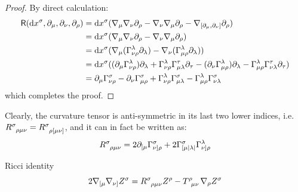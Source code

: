 \begin{proofbox}
  \begin{proof}
    By direct calculation:
    \begin{equation*}
      \begin{split}
        \textsf{R}(\mathrm{d} x^\sigma, \partial_\mu, \partial_\nu, \partial_\rho)
        &= \mathrm{d} x^\sigma (\nabla_\mu \nabla_\nu \partial_\rho - \nabla_\nu \nabla_\mu \partial_\rho - \nabla_{[\partial_\mu, \partial_\nu]} \partial_\rho) \\
        &= \mathrm{d} x^\sigma (\nabla_\mu \nabla_\nu \partial_\rho - \nabla_\nu \nabla_\mu \partial_\rho) \\
        &= \mathrm{d} x^\sigma (\nabla_\mu (\Gamma^\lambda_{\nu \rho} \partial_\lambda) - \nabla_\nu (\Gamma^\lambda_{\mu \rho} \partial_\lambda)) \\
        &= \mathrm{d} x^\sigma ((\partial_\mu \Gamma^\lambda_{\nu \rho}) \partial_\lambda + \Gamma^\lambda_{\nu \rho} \Gamma^\tau_{\mu \lambda} \partial_\tau - (\partial_\nu \Gamma^\lambda_{\mu \rho}) \partial_\lambda - \Gamma^\lambda_{\mu \rho} \Gamma^\tau_{\nu \lambda} \partial_{\tau}) \\
        &= \partial_\mu \Gamma^\sigma_{\nu \rho} - \partial_\nu \Gamma^\sigma_{\mu \rho} + \Gamma^\lambda_{\nu \rho} \Gamma^\sigma_{\mu \lambda} - \Gamma^\lambda_{\mu \rho} \Gamma^\sigma_{\nu \lambda}
      \end{split}
    \end{equation*}
    which completes the proof.
  \end{proof}
\end{proofbox}

Clearly, the curvature tensor is anti-symmetric in its last two lower indices, i.e. $ \tensor{R}{^\sigma _\rho _\mu _\nu} = \tensor{R}{^\sigma _\rho _[ _\mu _\nu _]} $, and it can in fact be written as:
\begin{equation}
  \tensor{R}{^\sigma _\rho _\mu _\nu} = 2 \pa_{[\mu} \Gamma^\sigma_{\nu] \rho} + 2 \Gamma^\sigma_{[\mu | \lambda |} \Gamma^\lambda_{\nu]\rho}
\end{equation}

\begin{theorem}[before upper = {\tcbtitle}]{Ricci identity}{}
  \begin{equation}
    2 \na_{[\mu} \na_{\nu]} Z^\sigma = \tensor{R}{^\sigma _\rho _\mu _\nu} Z^\rho - \tensor{T}{^\rho_{\mu \nu}} \na_\rho Z^\sigma
    \label{eq:ricci-id}
  \end{equation}
\end{theorem}

